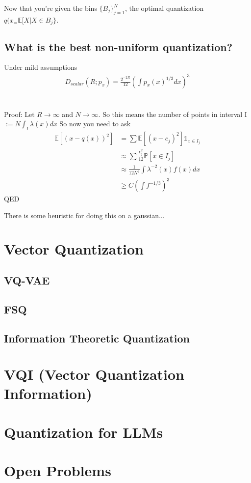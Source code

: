 Now that you're given the bins $\{B_j\}_{j=1}^N$, the optimal quantization $q(x_ = \mathbb E[X | X \in B_j\}$.


\subsection{What is the best non-uniform quantization?}
\begin{theorem}
	 Under mild assumptions
	\begin{align}
		D_{scalar}(R; p_x) = \frac{2^{-2R}}{12} \left ( \int p_x(x)^{1/3} dx\right)^3
	\end{align}
	\\
	\\
	Proof: Let $R \to \infty$ and $N \to \infty$. So this means the number of points in interval I $:= N \int_I \lambda(x) dx$ So now you need to ask
	\begin{align}
		\mathbb E[(x-q(x))^2] & = \sum \mathbb E[(x-c_j)^2] \mathds 1_{x \in I_j}\\
		&  \approx \sum \frac{\epsilon_j^2}{12} \mathbb P[x \in I_j]\\
		& \approx \frac{1}{12 N^2} \int \lambda^{-2}(x) f(x) dx \\
		& \geq C  \left(\int f^{-1/3} \right)^3 
	\end{align}
	 QED
\end{theorem}
There is some heuristic for doing this on a gaussian...




































\newpage
\section{Vector Quantization}
\subsection{VQ-VAE}
\subsection{FSQ}
\subsection{Information Theoretic Quantization}

\section{VQI (Vector Quantization Information)}
\section{Quantization for LLMs}

\section{Open Problems}